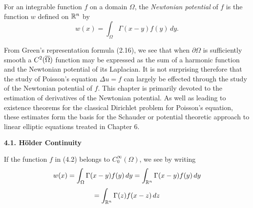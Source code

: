 For an integrable function $f$ on a domain $\Omega$, the \textit{Newtonian potential} of $f$ is the function $w$ defined on $\mathbb{R}^n$ by
\begin{equation}
w(x)=\int_{\Omega}\Gamma(x-y)f(y)\,dy.
\tag{4.2}
\end{equation}

From Green's representation formula (2.16), we see that when $\partial\Omega$ is sufficiently smooth a $C^2(\overline{\Omega})$ function may be expressed as the sum of a harmonic function and the Newtonian potential of its Laplacian. It is not surprising therefore that the study of Poisson's equation $\Delta u=f$ can largely be effected through the study of the Newtonian potential of $f$. This chapter is primarily devoted to the estimation of derivatives of the Newtonian potential. As well as leading to existence theorems for the classical Dirichlet problem for Poisson's equation, these estimates form the basis for the Schauder or potential theoretic approach to linear elliptic equations treated in Chapter 6.

\textbf{4.1. H\"older Continuity}

If the function $f$ in (4.2) belongs to $C_0^\infty(\Omega)$, we see by writing
\[
w(x)=\int_{\Omega}\Gamma(x-y)f(y)\,dy=\int_{\mathbb{R}^n}\Gamma(x-y)f(y)\,dy
\]
\[
=\int_{\mathbb{R}^n}\Gamma(z)f(x-z)\,dz
\]
